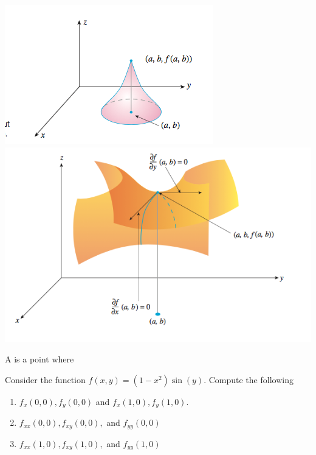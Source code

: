 \documentclass[12pt, a4paper]{article}
\begin{document}
\includegraphics[scale=0.5]{images/critical-pt-deriv-dne} \includegraphics[scale=0.35]{images/saddle-point}
\begin{defi}
  A  is a point where 
\end{defi}
\vspace{-0.1in}
\begin{ex}
  Consider the function \(f(x,y) = (1-x^2) \sin(y)\). Compute the
  following
  \begin{enumerate}
  \item \(f_x(0,0), f_y(0,0)\) and \(f_x(1,0),f_y(1,0)\).
    \vspace{0.75in}
  \item \(f_{xx}(0,0), f_{xy}(0,0), \) and \(f_{yy}(0,0)\)
    \vspace{0.75in}
  \item \(f_{xx}(1,0), f_{xy}(1,0),\) and \(f_{yy}(1,0)\)
  \end{enumerate}
\end{ex}
\vspace{-1.5in}
\end{document}
